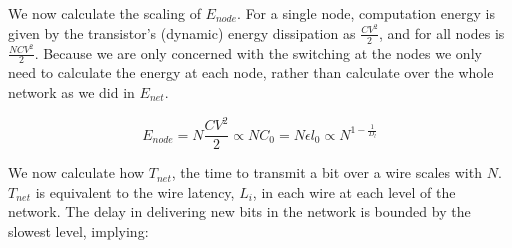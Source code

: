 \documentclass[12pt]{article}
\begin{document}
We now calculate the scaling of $E_{node}$. For a single node, computation
energy is given by the transistor's (dynamic) energy dissipation as
$\frac{CV^2}{2}$, and for all nodes is $\frac{NCV^2}{2}$. Because we are only
concerned with the switching at the nodes we only need to calculate the energy
at each node, rather than calculate over the whole network as we did in
$E_{net}$. 

\begin{equation}
  E_{node} = N\frac{CV^2}{2} \propto NC_0 = N \epsilon l_0 \propto
  N^{1-\frac{1}{D_l}}
\end{equation}







We now calculate how $T_{net}$, the time to transmit a bit over a wire scales
with $N$. $T_{net}$ is equivalent to the wire latency, $L_i$, in each wire at each
level of the network. The delay in delivering new bits in the network is
bounded by the slowest level, implying:
\end{document}
